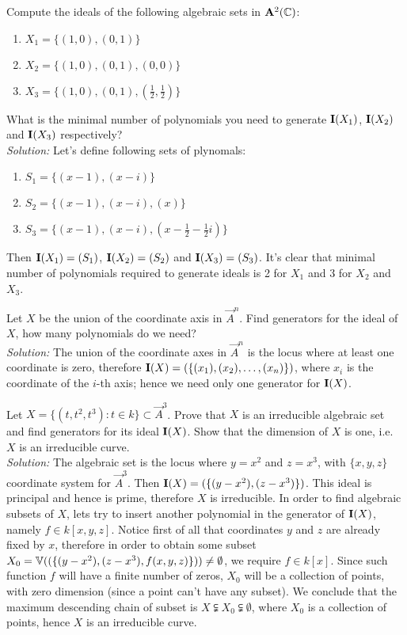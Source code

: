 \documentclass[../main/main.tex]{subfiles}
\begin{document}
\begin{ex}
Compute the ideals of the following algebraic sets in $\mathbf A^2(\mathbb C)$:
\begin{enumerate}[label=(\alph*)]
\item $X_1=\{(1,0),(0,1)\}$
\item $X_2=\{(1,0),(0,1),(0,0)\}$
\item $X_3=\{(1,0),(0,1),(\frac12,\frac12)\}$
\end{enumerate}
What is the minimal number of polynomials you need to generate $\mathbf I(X_1)$, $\mathbf I(X_2)$ and $\mathbf I(X_3)$ respectively?\\
%
\textit{Solution:}
%
Let's define following sets of plynomals:
\begin{enumerate}[label=(\alph*)]
\item $S_1=\{(x-1),(x-i)\}$
\item $S_2=\{(x-1),(x-i),(x)\}$
\item $S_3=\{(x-1),(x-i),(x-\frac12-\frac12i)\}$
\end{enumerate}
Then $\mathbf I(X_1)=(S_1)$, $\mathbf I(X_2)=(S_2)$ and $\mathbf I(X_3)=(S_3)$. It's clear that minimal number of polynomials required to generate ideals is 2 for $X_1$ and 3 for $X_2$ and $X_3$.
\end{ex}

\begin{ex}
Let $X$ be the union of the coordinate axis in $\vec A^n$. Find generators for the ideal of $X$, how many polynomials do we need?\\
%
\textit{Solution:}
%
The union of the coordinate axes in $\vec A^n$ is the locus where at least one coordinate is zero, therefore $\mathbf I(X)=(\{(x_1),(x_2),\dots,( x_n)\})$, where $x_i$ is the coordinate of the $i$-th axis; hence we need only one generator for $\mathbf I(X)$.

\end{ex}

\begin{ex}
Let $X=\{(t,t^2,t^3):t\in k\}\subset \vec A^3$. Prove that $X$ is an irreducible algebraic set and find generators for its ideal $\mathbf I(X)$. Show that the dimension of $X$ is one, i.e. $X$ is an irreducible curve.\\
%
\textit{Solution:}
%
The algebraic set is the locus where $y=x^2$ and $z=x^3$, with $\{x,y,z\}$ coordinate system for $\vec A^3$. Then $\mathbf I(X)=(\{(y-x^2),(z-x^3)\})$. This ideal is principal and hence is prime, therefore $X$ is irreducible.  
In order to find algebraic subsets of $X$, lets try to insert another polynomial in the generator of $\mathbf I(X)$, namely $f\in k[x,y,z]$. Notice first of all that coordinates $y$ and $z$ are already fixed by $x$, therefore in order to obtain some subset $X_0=\mathbb V((\{(y-x^2),(z-x^3), f(x,y,z)\}))\neq\emptyset$, we require $f\in k[x]$. Since such function $f$ will have a finite number of zeros, $X_0$ will be a collection of points, with zero dimension (since a point can't have any subset). We conclude that the maximum descending chain of subset is $X\subsetneqq X_0\subsetneqq\emptyset$, where $X_0$ is a collection of points, hence $X$ is an irreducible curve.
\end{ex}
\end{document}
